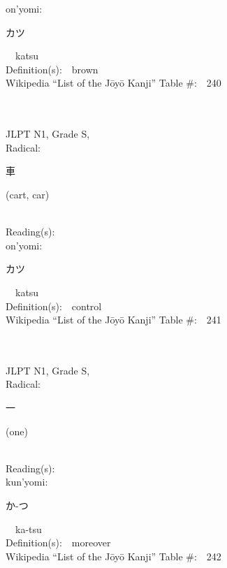 \begin{multicols}{2}
{\hspace*{1em}}on'yomi:\ \ \\
{\hspace*{2em}}{\begin{CJK}{UTF8}{min} カツ \end{CJK}}\ \ katsu\ \ \\
Definition(s):\ \ brown \\
Wikipedia ``List of the J\=oy\=o Kanji'' Table \#:\ \ 240 \\
\ \ \\
{\fontsize{34pt}{40pt}  }\ \ \\
{JLPT N1, Grade S, \\Radical:\ \ {\begin{CJK}{UTF8}{min} 車 \end{CJK}} (cart, car) } \\
Reading(s):\ \ \\
{\hspace*{1em}}on'yomi:\ \ \\
{\hspace*{2em}}{\begin{CJK}{UTF8}{min} カツ \end{CJK}}\ \ katsu\ \ \\
Definition(s):\ \ control \\
Wikipedia ``List of the J\=oy\=o Kanji'' Table \#:\ \ 241 \\
\ \ \\
{\fontsize{34pt}{40pt}  }\ \ \\
{JLPT N1, Grade S, \\Radical:\ \ {\begin{CJK}{UTF8}{min} 一 \end{CJK}} (one) } \\
Reading(s):\ \ \\
{\hspace*{1em}}kun'yomi:\ \ \\
{\hspace*{2em}}{\begin{CJK}{UTF8}{min} か-つ \end{CJK}}\ \ ka-tsu\ \ \\
Definition(s):\ \ moreover \\
Wikipedia ``List of the J\=oy\=o Kanji'' Table \#:\ \ 242 \\

\end{multicols}
